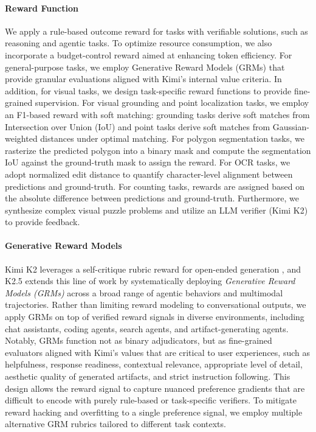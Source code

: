 \documentclass{article}
\begin{document}
\paragraph{Reward Function} 
We apply a rule-based outcome reward for tasks with verifiable solutions, such as reasoning and agentic tasks. 
To optimize resource consumption, we also incorporate a budget-control reward aimed at enhancing token efficiency. 
For general-purpose tasks, we employ Generative Reward Models (GRMs) that provide granular evaluations aligned with Kimi's internal value criteria. 
In addition, for visual tasks, we design task-specific reward functions to provide fine-grained supervision. 
For visual grounding and point localization tasks, we employ an F1-based reward with soft matching: grounding tasks derive soft matches from Intersection over Union (IoU) and point tasks derive soft matches from Gaussian-weighted distances under optimal matching. 
For polygon segmentation tasks, we rasterize the predicted polygon into a binary mask and compute the segmentation IoU against the ground-truth mask to assign the reward. 
For OCR tasks, we adopt normalized edit distance to quantify character-level alignment between predictions and ground-truth. 
For counting tasks, rewards are assigned based on the absolute difference between predictions and ground-truth. 
Furthermore, we synthesize complex visual puzzle problems and utilize an LLM verifier (Kimi K2) to provide feedback.

\paragraph{Generative Reward Models}
Kimi K2 leverages a self-critique rubric reward for open-ended generation \cite{team2025kimik2}, and K2.5 extends this line of work by systematically deploying \emph{Generative Reward Models (GRMs)} across a broad range of agentic behaviors and multimodal trajectories. Rather than limiting reward modeling to conversational outputs, we apply GRMs on top of verified reward signals in diverse environments, including chat assistants, coding agents, search agents, and artifact-generating agents. Notably, GRMs function not as binary adjudicators, but as fine-grained evaluators aligned with Kimi's values that are critical to user experiences, such as helpfulness, response readiness, contextual relevance, appropriate level of detail, aesthetic quality of generated artifacts, and strict instruction following. This design allows the reward signal to capture nuanced preference gradients that are difficult to encode with purely rule-based or task-specific verifiers.
To mitigate reward hacking and overfitting to a single preference signal, we employ multiple alternative GRM rubrics tailored to different task contexts.
\end{document}
